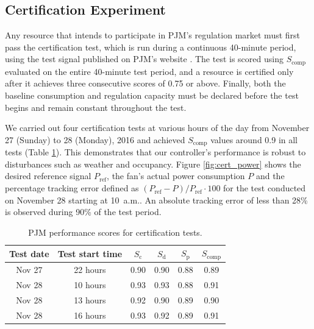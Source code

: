 
\subsection{Certification Experiment}\label{sec:certification_exp}
Any resource that intends to participate in PJM's regulation market must first pass the certification test, which is run during a continuous 40-minute period, using the test signal published on PJM's website \cite{PJM_signal_price}.
The test is scored using $S_\text{comp}$ evaluated on the entire 40-minute test period, and a resource is certified only after it achieves three consecutive scores of 0.75 or above.
Finally, both the baseline consumption and regulation capacity must be declared before the test begins and remain constant throughout the test.



We carried out four certification tests at various hours of the day from November 27 (Sunday) to 28 (Monday), 2016 and achieved $S_\text{comp}$ values around 0.9 in all tests (Table \ref{tab:certification}). This demonstrates that our controller's performance is robust to disturbances such as weather and occupancy. 
Figure \ref{fig:cert_power} shows the desired reference signal $P_{\text{ref}}$, the fan's actual power consumption $P$ and the percentage tracking error defined as $(P_\text{ref} - P)/P_\text{ref} \cdot 100 $ for the test conducted on November 28 starting at 10~a.m.. An absolute tracking error of less than 28\% is observed during 90\% of the test period.

\begin{table}[b]
\centering
\begin{tabular}{c | c | c c c | c}
\toprule
Test date & Test start time & $S_\text{c}$ & $S_\text{d}$ & $S_\text{p}$ & $S_\text{comp}$  \\ \hline
Nov 27 & 22 hours & 0.90 & 0.90 & 0.88 & 0.89\\
Nov 28 & 10 hours & 0.93 & 0.93 & 0.88 & 0.91 \\
Nov 28 & 13 hours & 0.92 & 0.90 & 0.89 & 0.90 \\
Nov 28 & 16 hours & 0.93 & 0.92 & 0.89 & 0.91 \\
\bottomrule
\end{tabular}
\caption{PJM performance scores for certification tests.}
\label{tab:certification}
\end{table}

